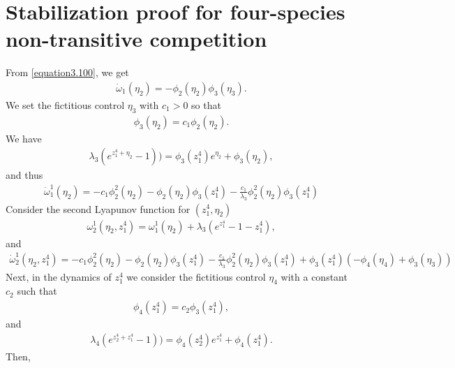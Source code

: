 \documentclass[10pt, a4paper]{amsart}
\makeatletter
\theoremstyle{plain}
\theoremstyle{definition}
\theoremstyle{remark}
\renewenvironment{proof}[1][\proofname]{\par
  \pushQED{\qed}%
  \normalfont \topsep6\p@\@plus6\p@\relax
  \trivlist
  \item[\hskip\labelsep
        \itshape
    #1\ \ref{#1}.]\ignorespaces
}{%
  \popQED\endtrivlist\@endpefalse
}
\numberwithin{equation}{section}
\makeatother
\begin{document}
\section{\bf Stabilization proof for four-species non-transitive competition}\label{annexe:A}
\begin{proof}[of Proposition \ref{proposition3.17}]
From \eqref{equation3.100}, we get 
\begin{align}
\dot \omega_1(\eta_2)=-\phi_2(\eta_2)\phi_3(\eta_3).
\end{align}
We set the fictitious control $\eta_3$ with $c_1>0$ so that %
\begin{align}
\phi_3(\eta_2)=c_1\phi_2(\eta_2).%
\end{align}
We have 
\begin{align}\label{a3.89}
\lambda_3(e^{z^4_1+\eta_2}-1))= \phi_3(z^4_1)e^{\eta_2}+\phi_3(\eta_2),
\end{align}
 and thus 
\begin{align}
\dot \omega^1_1(\eta_2)=-c_1\phi^2_2(\eta_2)- \phi_2(\eta_2)\phi_3(z^4_1)-\frac{c_1}{\lambda_3}\phi^2_2(\eta_2)\phi_3(z^4_1)
\end{align} 
Consider the second Lyapunov function for $(z^4_1,\eta_2)$ 
\begin{align}
\omega^1_2(\eta_2,z^4_1)=\omega^1_1(\eta_2)+\lambda_3(e^{z^4_1}-1-z^4_1),
\end{align}
 and 
 \begin{align}
 \dot \omega^1_2(\eta_2,z^4_1)=-c_1\phi^2_2(\eta_2)- \phi_2(\eta_2)\phi_3(z^4_1)-\frac{c_1}{\lambda_3}\phi^2_2(\eta_2)\phi_3(z^4_1)+\phi_3(z^4_1)\left(-\phi_4(\eta_4)+\phi_3(\eta_3)\right)   
 \end{align}
 Next, in the dynamics of $z^4_1$ we consider the fictitious control $\eta_4$ with a constant $c_2$ such that %
 \begin{align}
\phi_4(z^4_1)=c_2\phi_3(z^4_1),%
\end{align}
and 
\begin{align}\label{a3.95}
\lambda_4(e^{z^4_2+z^4_1}-1))= \phi_4(z^4_2)e^{z^4_1}+\phi_4(z^4_1).
\end{align}
Then,


\end{proof}
\end{document}
